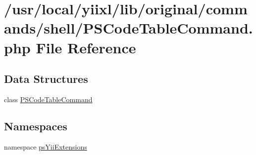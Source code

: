 \hypertarget{PSCodeTableCommand_8php}{
\section{/usr/local/yiixl/lib/original/commands/shell/PSCodeTableCommand.php File Reference}
\label{PSCodeTableCommand_8php}
}
\subsection*{Data Structures}
\begin{DoxyCompactItemize}
\item 
class \hyperlink{classPSCodeTableCommand}{PSCodeTableCommand}
\end{DoxyCompactItemize}
\subsection*{Namespaces}
\begin{DoxyCompactItemize}
\item 
namespace \hyperlink{namespacepsYiiExtensions}{psYiiExtensions}
\end{DoxyCompactItemize}
